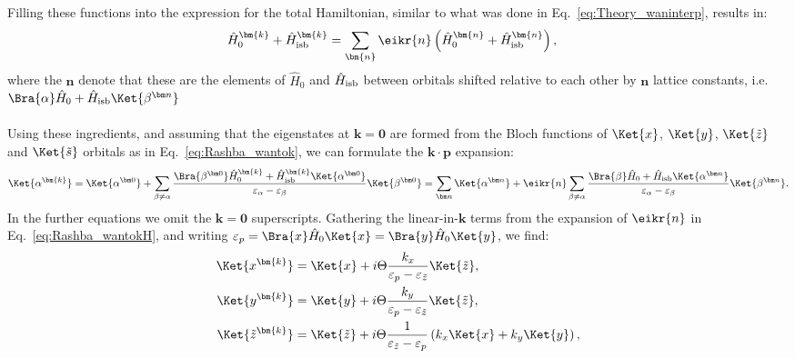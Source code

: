 Filling these functions into the expression for the total Hamiltonian, similar to what was done in Eq.~\eqref{eq:Theory_waninterp}, results in:
\begin{align}
	\label{eq:Rashba_wantokH}
	\hat{H}_0^{\bm{k}} + \hat{H}_{\rm isb}^{\bm{k}} &= \sum_{\bm{n}} \eikr{n} \left(\hat{H}_0^{\bm{n}} + \hat{H}_{\rm isb}^{\bm{n}}\right),%
\end{align}
where the $\bm n$ denote that these are the elements of $\hat{H}_0$ and $\hat{H}_{\rm isb}$ between orbitals shifted relative to each other by $\bm n$ lattice constants, i.e. $\Bra{\alpha} \hat H_0 + \hat H_{\rm isb} \Ket{\beta^{\bm n}}$
\\\\
Using these ingredients, and assuming that the eigenstates at $\bm k = \bm 0$ are formed from the Bloch functions of $\Ket{x}$, $\Ket{y}$, $\Ket{\tilde{z}}$ and $\Ket{\tilde{s}}$ orbitals as in Eq.~\eqref{eq:Rashba_wantok}, we can formulate the $\bm k \cdot \bm p$ expansion:
\begin{equation}
	\label{eq:Rashba_kdotp}
	\Ket{\alpha^{\bm{k}}}=\Ket{\alpha^{\bm 0}} + \sum_{\beta \neq \alpha} \frac{\Bra{\beta^{\bm 0}} \hat{H}_0^{\bm{k}} + \hat{H}_{\rm isb}^{\bm{k}} \Ket{\alpha^{\bm 0}}}{\varepsilon_{\alpha} - \varepsilon_{\beta}} \Ket{\beta^{\bm 0}} = \sum_{\bm n} \Ket{\alpha^{\bm n}} + \eikr{n} \sum_{\beta \neq \alpha} \frac{\Bra{\beta} \hat{H}_0 + \hat{H}_{\rm isb} \Ket{\alpha^{\bm n}}}{\varepsilon_{\alpha} - \varepsilon_{\beta}} \Ket{\beta^{\bm n}}.
\end{equation}
In the further equations we omit the $\bm{k}=\bm 0$ superscripts.
Gathering the linear-in-$\bm k$ terms from the expansion of $\eikr{n}$ in Eq.~\eqref{eq:Rashba_wantokH}, and writing $\varepsilon_p = \Bra{x} \hat{H}_0 \Ket{x} = \Bra{y} \hat{H}_0 \Ket{y}$, we find:
\begin{align}
	\Ket{x^{\bm{k}}} &= \Ket{x} + i \Theta \frac{k_x}{\varepsilon_p - \varepsilon_{\tilde{z}}}\Ket{\tilde{z}}, \\
	\Ket{y^{\bm{k}}} &= \Ket{y} + i \Theta \frac{k_y}{\varepsilon_p - \varepsilon_{\tilde{z}}}\Ket{\tilde{z}},\\
	\Ket{\tilde{z}^{\bm{k}}} &= \Ket{\tilde{z}} + i \Theta \frac{1}{\varepsilon_{\tilde{z}} - \varepsilon_p} \left(k_x\Ket{x} + k_y\Ket{y}\right),
\end{align}
